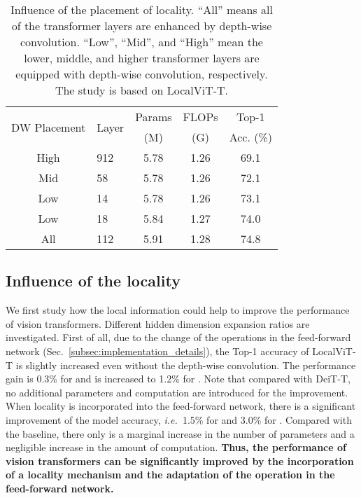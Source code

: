 \documentclass[10pt,twocolumn,letterpaper]{article}
\def\ie{\emph{i.e.\ }}
\begin{document}
\begin{table}[!t]
    \small
    \begin{center}
        \begin{tabular}{c|l|c|c|c}
            \toprule
            \multirow{2}{*}{DW Placement} & \multirow{2}{*}{Layer} & Params & FLOPs & \multicolumn{1}{c}{Top-1} \\ 
            & & \multicolumn{1}{c|}{(M)} & \multicolumn{1}{c|}{(G)} & \multicolumn{1}{c}{Acc. (\%)} \\\midrule
High & 912 & 5.78 & 1.26 & 69.1 \\ 
            Mid & 58   & 5.78 & 1.26 & 72.1 \\ 
            Low & 14   & 5.78 & 1.26 & 73.1 \\ 
            Low & 18   & 5.84 & 1.27 & 74.0 \\ 
            All & 112  & 5.91 & 1.28 & 74.8 \\ \bottomrule
        \end{tabular}
    \end{center}
\caption{Influence of the placement of locality. ``All'' means all of the transformer layers are enhanced by depth-wise convolution. ``Low'', ``Mid'', and ``High'' mean the lower, middle, and higher transformer layers are equipped with depth-wise convolution, respectively. The study is based on LocalViT-T.}
    \label{tbl:placement}
    \vspace{-0.6cm}
\end{table}


\subsection{Influence of the locality}
We first study how the local information could help to improve the performance of vision transformers. Different hidden dimension expansion ratios  are investigated. First of all, due to the change of the operations in the feed-forward network (Sec.~\ref{subsec:implementation_details}), the Top-1 accuracy of LocalViT-T is slightly increased even without the depth-wise convolution. The performance gain is 0.3\% for  and is increased to 1.2\% for . Note that compared with DeiT-T, no additional parameters and computation are introduced for the improvement. When locality is incorporated into the feed-forward network, there is a significant improvement of the model accuracy, \ie 1.5\% for  and 3.0\% for . Compared with the baseline, there only is a marginal increase in the number of parameters and a negligible increase in the amount of computation. \textbf{Thus, the performance of vision transformers can be significantly improved by the incorporation of a locality mechanism and the adaptation of the operation in the feed-forward network.}
\end{document}
